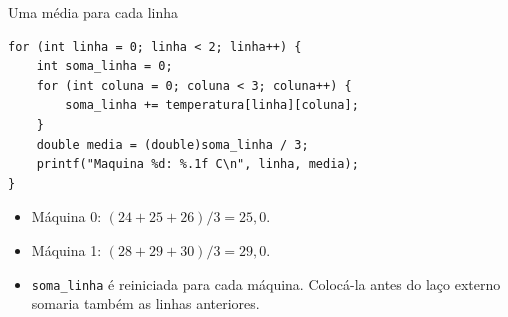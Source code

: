 \begin{frame}[fragile]{Uma média para cada linha}
\begin{lstlisting}
for (int linha = 0; linha < 2; linha++) {
    int soma_linha = 0;
    for (int coluna = 0; coluna < 3; coluna++) {
        soma_linha += temperatura[linha][coluna];
    }
    double media = (double)soma_linha / 3;
    printf("Maquina %d: %.1f C\n", linha, media);
}
\end{lstlisting}
\begin{itemize}
\item Máquina 0: $(24+25+26)/3=25{,}0$.
\item Máquina 1: $(28+29+30)/3=29{,}0$.
\item \texttt{soma\_linha} é reiniciada para cada máquina. Colocá-la antes do laço externo somaria também as linhas anteriores.
\end{itemize}
\end{frame}
